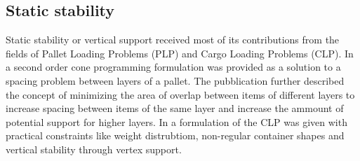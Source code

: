 \subsection*{Static stability}
Static stability or vertical support received most of its contributions from the fields of Pallet Loading Problems (PLP) and Cargo Loading Problems (CLP). In \citep{elhedhli2019three} a second order cone programming formulation was provided as a solution to a spacing problem between layers of a pallet. The pubblication further described the concept of minimizing the area of overlap between items of different layers to increase spacing between items of the same layer and increase the ammount of potential support for higher layers.
In \citep{paquay2016mixed} a formulation of the CLP was given with practical constraints like weight distrubtiom, non-regular container shapes and vertical stability through vertex support.